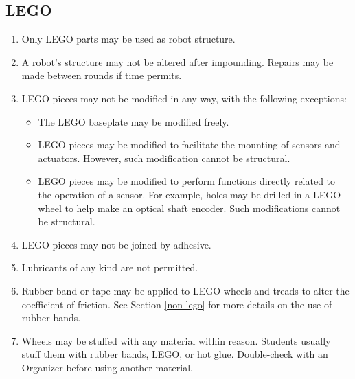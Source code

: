 \subsection{LEGO}
\begin{enumerate}

\item Only LEGO parts may be used as robot structure.

\item A robot's structure may not be altered after impounding. Repairs may be
made between rounds if time permits.

\item LEGO pieces may not be modified in any way, with the following exceptions:

\begin{itemize}

\item The LEGO baseplate may be modified freely.

\item LEGO pieces may be modified to facilitate the mounting of sensors and
actuators. However, such modification cannot be structural.

\item LEGO pieces may be modified to perform functions directly related to the
operation of a sensor. For example, holes may be drilled in a LEGO wheel to help
make an optical shaft encoder. Such modifications cannot be structural.

\end{itemize}

\item LEGO pieces may not be joined by adhesive.

\item Lubricants of any kind are not permitted.

\item Rubber band or tape may be applied to LEGO wheels and treads to alter the
coefficient of friction.  See Section \ref{non-lego} for more details on the use
of rubber bands.

\item Wheels may be stuffed with any material within reason.  Students usually
stuff them with rubber bands, LEGO, or hot glue.  Double-check with an Organizer
before using another material.

\end{enumerate}

